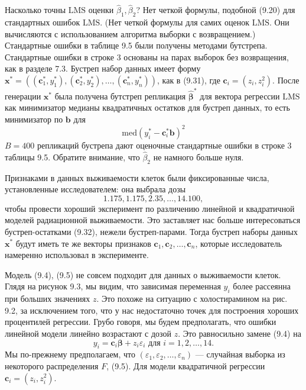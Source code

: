 Насколько точны $\text{LMS}$ оценки $\hat{\beta}_1, \hat{\beta}_2$? Нет четкой формулы, подобной (9.20) для стандартных ошибок $\text{LMS}$. (Нет четкой формулы для самих оценок $\text{LMS}$. Они вычисляются с использованием алгоритма выборки с возвращением.) Стандартные ошибки в таблице 9.5 были получены методами бутстрепа. Стандартные ошибки в строке 3 основаны на парах выборок без возвращения, как в разделе 7.3. Бустреп набор данных имеет форму $\textbf{x}^* = ((\textbf{c}_1^*, y_1^*), (\textbf{c}_2^*, y_2^*), \ldots, (\textbf{c}_n^*, y_n^*))$, как в (9.31), где $\textbf{c}_i = (z_i, z_i^2)$. После генерации $\textbf{x}^*$ была получена бутстреп репликация $\hat{\bm{\beta}}^*$ для вектора регрессии $\text{LMS}$ как минимизатор медианы квадратичных остатков для бустреп данных, то есть минимизатор по $\textbf{b}$ для
\begin{equation}
	\text{med}(y_i^* - \textbf{c}_i^* \textbf{b})^2
\end{equation}
$B = 400$ репликаций бустрепа дают оценочные стандартные ошибки в строке 3 таблицы 9.5. Обратите внимание, что $\hat{\beta}_2$ не намного больше нуля.

Признаками в данных выживаемости клеток были фиксированные числа, установленные исследователем: она выбрала дозы $$1.175,1.175,2.35,\ldots,14.100,$$ чтобы провести хороший эксперимент по различению линейной и квадратичной моделей радиационной выживаемости. Это заставляет нас больше интересоваться бустреп-остатками (9.32), нежели бустреп-парами. Тогда бустреп наборы данных $\textbf{x}^*$ будут иметь те же векторы признаков $\textbf{c}_1, \textbf{c}_2,\ldots,\textbf{c}_n$, которые исследователь намеренно использовал в эксперименте.

Модель (9.4), (9.5) не совсем подходит для данных о выживаемости клеток. Глядя на рисунок 9.3, мы видим, что зависимая переменная $y_i$ более рассеянна при больших значениях $z$. Это похоже на ситуацию с холостирамином на рис. 9.2, за исключением того, что у нас недостаточно точек для построения хороших процентилей регрессии. Грубо говоря, мы будем предполагать, что ошибки линейной модели линейно возрастают с дозой $z$. Это равносильно замене (9.4) на
\begin{equation}
	y_i = \textbf{c}_i \bm{\beta} + z_i \varepsilon_i \text{  для  } i=1,2,\ldots,14.
\end{equation}
Мы по-прежнему предполагаем, что $(\varepsilon_1, \varepsilon_2, \ldots, \varepsilon_n)$ --- случайная выборка из некоторого распределения $F$, (9.5). Для модели квадратичной регрессии $\textbf{c}_i = (z_i, z_i^2)$.

